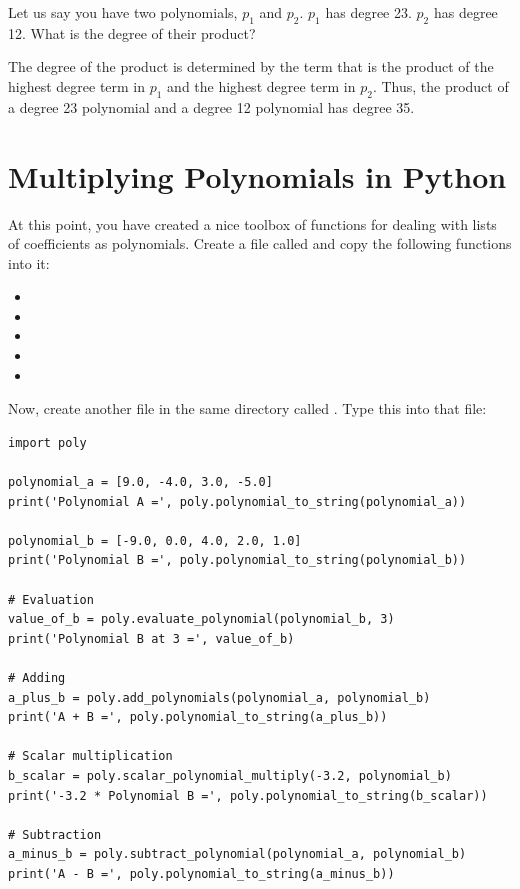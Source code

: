 \begin{Exercise}[title={Observations}, label=obsmultpoly]
  Let us say you have two polynomials, $p_1$ and $p_2$.  $p_1$ has degree
  23.  $p_2$ has degree 12.  What is the degree of their product?
\end{Exercise}
\begin{Answer}[ref=obsmultpoly]
  The degree of the product is determined by the term that is the
  product of the highest degree term in $p_1$ and the highest degree
  term in $p_2$. Thus, the product of a degree 23 polynomial and a
  degree 12 polynomial has degree 35.
\end{Answer}
  


\section{Multiplying Polynomials in Python}
At this point, you have created a nice toolbox of functions for
dealing with lists of coefficients as polynomials. Create a file called  and copy the following functions into it:
\begin{itemize}
\item {}
\item {}
\item {}
\item {}
\item {}
\end{itemize}

Now, create another file in the same directory called . Type this into that file:
\begin{verbatim}
import poly

polynomial_a = [9.0, -4.0, 3.0, -5.0]
print('Polynomial A =', poly.polynomial_to_string(polynomial_a))

polynomial_b = [-9.0, 0.0, 4.0, 2.0, 1.0]
print('Polynomial B =', poly.polynomial_to_string(polynomial_b))

# Evaluation
value_of_b = poly.evaluate_polynomial(polynomial_b, 3)
print('Polynomial B at 3 =', value_of_b)

# Adding
a_plus_b = poly.add_polynomials(polynomial_a, polynomial_b)
print('A + B =', poly.polynomial_to_string(a_plus_b))

# Scalar multiplication
b_scalar = poly.scalar_polynomial_multiply(-3.2, polynomial_b)
print('-3.2 * Polynomial B =', poly.polynomial_to_string(b_scalar))

# Subtraction
a_minus_b = poly.subtract_polynomial(polynomial_a, polynomial_b)
print('A - B =', poly.polynomial_to_string(a_minus_b))
\end{verbatim}

